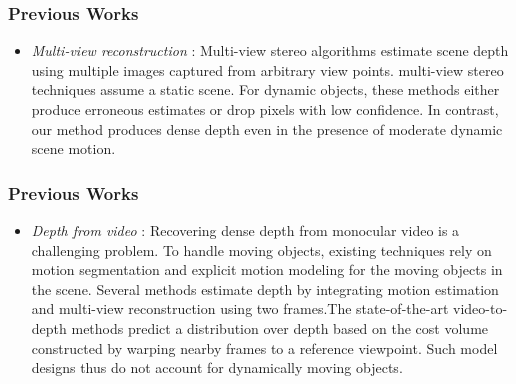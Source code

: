 \documentclass{beamer}
\begin{document}
	\begin{frame}
	\frametitle{Previous Works}
	\begin{itemize}
	
	\item \textit{Multi-view reconstruction} : Multi-view stereo algorithms estimate
	scene depth using multiple images captured from arbitrary view points. multi-view stereo techniques assume a static scene.
	For dynamic objects, these methods either produce erroneous estimates or drop pixels with low confidence. In contrast, our method
	produces dense depth even in the presence of moderate dynamic scene motion.
	\end{itemize}
	\end{frame}
	
	\begin{frame}
	\frametitle{Previous Works}
	\begin{itemize}
	
	\item \textit{Depth from video} : Recovering dense depth from monocular video is a challenging problem. To handle moving objects, existing techniques rely on motion segmentation and explicit motion modeling for the moving objects in the scene. 
	Several methods estimate depth by integrating motion estimation and multi-view reconstruction using two frames.The state-of-the-art video-to-depth methods predict a distribution over depth based on the cost volume constructed by warping nearby frames to a reference viewpoint. Such model designs thus do not account for dynamically moving objects.
	\end{itemize}
	
	\end{frame}
	
	
\end{document}
